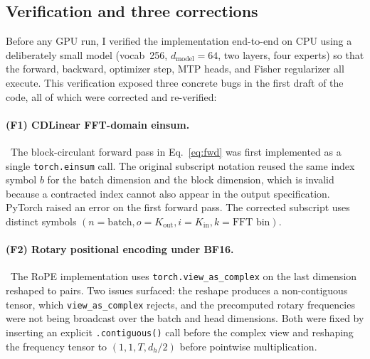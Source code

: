 \documentclass[aps,prx,onecolumn,11pt,nofootinbib,longbibliography]{revtex4-2}
\begin{document}
\subsection{Verification and three corrections}
\label{sec:impl:fixes}

Before any GPU run, I verified the implementation end-to-end on CPU
using a deliberately small model (vocab~256, $d_\textrm{model}{=}64$,
two layers, four experts) so that the forward, backward, optimizer
step, MTP heads, and Fisher regularizer all execute.  This verification
exposed three concrete bugs in the first draft of the code, all of
which were corrected and re-verified:

\paragraph{(F1) CDLinear FFT-domain einsum.}~The block-circulant
forward pass in Eq.~\ref{eq:fwd} was first implemented as a single
\texttt{torch.einsum} call.  The original subscript notation reused the
same index symbol $b$ for the batch dimension and the block dimension,
which is invalid because a contracted index cannot also appear in the
output specification.  PyTorch raised an error on the first forward
pass.  The corrected subscript uses distinct symbols
$(n{=}\textrm{batch}, o{=}K_\textrm{out}, i{=}K_\textrm{in}, k{=}\textrm{FFT bin})$.

\paragraph{(F2) Rotary positional encoding under BF16.}~The RoPE
implementation uses \texttt{torch.view\_as\_complex} on the last
dimension reshaped to pairs.  Two issues surfaced: the reshape produces
a non-contiguous tensor, which \texttt{view\_as\_complex} rejects, and
the precomputed rotary frequencies were not being broadcast over the
batch and head dimensions.  Both were fixed by inserting an explicit
\texttt{.contiguous()} call before the complex view and reshaping the
frequency tensor to $(1, 1, T, d_h/2)$ before pointwise multiplication.
\end{document}
